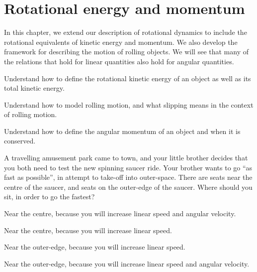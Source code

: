 
\chapter{Rotational energy and momentum}
\label{chapter:angularmomentumrolling}
In this chapter, we extend our description of rotational dynamics to include the rotational equivalents of kinetic energy and momentum. We also develop the framework for describing the motion of rolling objects. We will see that many of the relations that hold for linear quantities also hold for angular quantities. 

\begin{learningObjectives}{
 \item Understand how to define the rotational kinetic energy of an object as well as its total kinetic energy.
 \item Understand how to model rolling motion, and what slipping means in the context of rolling motion.
 \item Understand how to define the angular momentum of an object and when it is conserved.
 }
\end{learningObjectives}

\begin{opening}
\begin{MCquestion}{A travelling amusement park came to town, and your little brother decides that you both need to test the new spinning saucer ride. Your brother wants to go ``as fast as possible'', in attempt to take-off into outer-space. There are seats near the centre of the saucer, and seats on the outer-edge of the saucer. Where should you sit, in order to go the fastest?}
\item Near the centre, because you will increase linear speed and angular velocity.
\item Near the centre, because you will increase linear speed.
\item Near the outer-edge, because you will increase linear speed. %
\item Near the outer-edge, because you will increase linear speed and angular velocity.
\end{MCquestion}
\end{opening}

